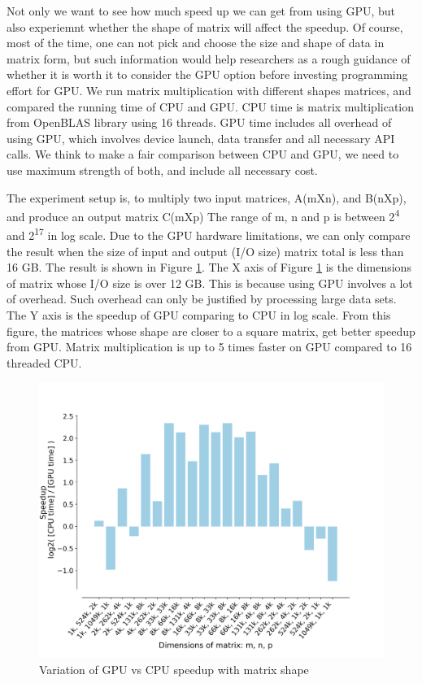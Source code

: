 \documentclass[9pt,twocolumn,twoside,lineno]{gsag3jnl}
\begin{document}
Not only we want to see how much speed up we can get from using GPU, but also experiemnt whether the shape of matrix will affect the speedup. 
Of course, most of the time, one can not pick and choose the size and shape of data in matrix form, 
but such information would help researchers as a rough guidance of whether it is worth it to consider the GPU option before investing programming effort for GPU. 
We run matrix multiplication with different shapes matrices, and compared the running time of CPU and GPU. 
CPU time is matrix multiplication from OpenBLAS library using 16 threads. 
GPU time includes all overhead of using GPU, which involves device launch, data transfer and all necessary API calls.
We think to make a fair comparison between CPU and GPU, we need to use maximum strength of both, and include all necessary cost. 

The experiment setup is, to multiply two input matrices, A(mXn), and B(nXp), and produce an output matrix C(mXp)
The range of m, n and p is between 2\textsuperscript{4} and 2\textsuperscript{17} in log scale.
Due to the GPU hardware limitations, we can only compare the result when the size of input and output (I/O size) matrix total is less than 16 GB. 
The result is shown in Figure \ref{GPUCPUShape}. 
The X axis of Figure \ref{GPUCPUShape} is the dimensions of matrix whose I/O size is over 12 GB.
This is because using GPU involves a lot of overhead. 
Such overhead can only be justified by processing large data sets. 
The Y axis is the speedup of GPU comparing to CPU in log scale.  
From this figure, the matrices whose shape are closer to a square matrix, get better speedup from GPU.
Matrix multiplication is up to 5 times faster on GPU compared to 16 threaded CPU. 


\begin{figure}[!htb]
	\centering
	\caption{Variation of GPU vs CPU speedup with matrix shape
	}
	\label{GPUCPUShape}
	\includegraphics[scale = 0.35]{figs/speedup.png}
\end{figure} 
\end{document}
